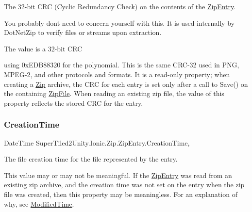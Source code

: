 The 32-\/bit C\+RC (Cyclic Redundancy Check) on the contents of the \mbox{\hyperlink{class_super_tiled2_unity_1_1_ionic_1_1_zip_1_1_zip_entry}{Zip\+Entry}}. 

You probably don\textquotesingle{}t need to concern yourself with this. It is used internally by Dot\+Net\+Zip to verify files or streams upon extraction. 

The value is a 32-\/bit C\+RC

using 0x\+E\+D\+B88320 for the polynomial. This is the same C\+R\+C-\/32 used in P\+NG, M\+P\+E\+G-\/2, and other protocols and formats. It is a read-\/only property; when creating a \mbox{\hyperlink{namespace_super_tiled2_unity_1_1_ionic_1_1_zip}{Zip}} archive, the C\+RC for each entry is set only after a call to {\ttfamily Save()} on the containing \mbox{\hyperlink{class_super_tiled2_unity_1_1_ionic_1_1_zip_1_1_zip_file}{Zip\+File}}. When reading an existing zip file, the value of this property reflects the stored C\+RC for the entry. \mbox{\label{class_super_tiled2_unity_1_1_ionic_1_1_zip_1_1_zip_entry_a38ef2ae810c3b89b1f23ebea918fb60e}} 
\subsubsection{\texorpdfstring{Creation\+Time}{CreationTime}}
{\footnotesize\ttfamily Date\+Time Super\+Tiled2\+Unity.\+Ionic.\+Zip.\+Zip\+Entry.\+Creation\+Time\hspace{0.3cm}{\ttfamily [get]}, {\ttfamily [set]}}



The file creation time for the file represented by the entry. 

This value may or may not be meaningful. If the {\ttfamily \mbox{\hyperlink{class_super_tiled2_unity_1_1_ionic_1_1_zip_1_1_zip_entry}{Zip\+Entry}}} was read from an existing zip archive, and the creation time was not set on the entry when the zip file was created, then this property may be meaningless. For an explanation of why, see \mbox{\hyperlink{class_super_tiled2_unity_1_1_ionic_1_1_zip_1_1_zip_entry_a88021d72ea8b94c762388d92d74c2e0d}{Modified\+Time}}. 

